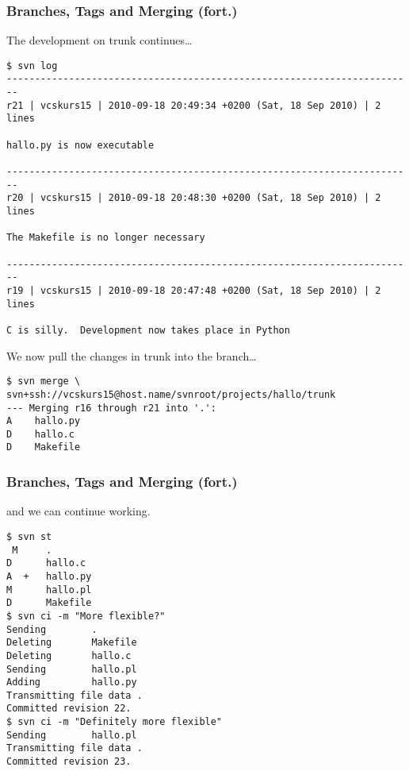\begin{frame}[fragile]
    \frametitle{Branches, Tags and Merging (fort.)}
    \linuxframe

    The development on trunk continues\ldots
\begin{lstlisting}[basicstyle=\tiny\ttfamily\color{black}]
$ svn log
------------------------------------------------------------------------
r21 | vcskurs15 | 2010-09-18 20:49:34 +0200 (Sat, 18 Sep 2010) | 2 lines

hallo.py is now executable

------------------------------------------------------------------------
r20 | vcskurs15 | 2010-09-18 20:48:30 +0200 (Sat, 18 Sep 2010) | 2 lines

The Makefile is no longer necessary

------------------------------------------------------------------------
r19 | vcskurs15 | 2010-09-18 20:47:48 +0200 (Sat, 18 Sep 2010) | 2 lines

C is silly.  Development now takes place in Python
\end{lstlisting}

We now pull the changes in trunk into the branch\ldots
\begin{lstlisting}[basicstyle=\tiny\ttfamily\color{black}]
$ svn merge \
svn+ssh://vcskurs15@host.name/svnroot/projects/hallo/trunk
--- Merging r16 through r21 into '.':
A    hallo.py
D    hallo.c
D    Makefile
\end{lstlisting}
\end{frame}

\begin{frame}[fragile]
    \frametitle{Branches, Tags and Merging (fort.)}
    \linuxframe

    and we can continue working.
\begin{lstlisting}[basicstyle=\tiny\ttfamily\color{black}]
$ svn st
 M     .
D      hallo.c
A  +   hallo.py
M      hallo.pl
D      Makefile
$ svn ci -m "More flexible?"
Sending        .
Deleting       Makefile
Deleting       hallo.c
Sending        hallo.pl
Adding         hallo.py
Transmitting file data .
Committed revision 22.
$ svn ci -m "Definitely more flexible"
Sending        hallo.pl
Transmitting file data .
Committed revision 23.
\end{lstlisting}
\end{frame}

